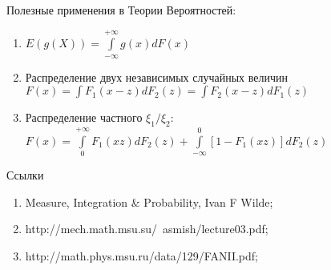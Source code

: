 \documentclass{beamer}%
\theoremstyle{definition}
\begin{document}
\begin{frame}
Полезные применения в Теории Вероятностей:

\begin{enumerate}
    \item $E(g(X)) = \int \limits_{-\infty}^{+\infty} g(x)dF(x)$
    \item Распределение двух независимых случайных величин $F(x) = \int F_1(x - z)dF_2(z) = \int F_2(x - z)dF_1(z)$
    \item Распределение частного $\xi_1/\xi_2$: $F(x) = \int \limits_{0}^{+\infty} F_1(xz)dF_2(z) + \int \limits_{-\infty}^{0} [1 - F_1(xz)]dF_2(z)$
\end{enumerate}
  
\end{frame}
\begin{frame}{Ссылки}

\begin{enumerate}
    \item Measure, Integration \& Probability, Ivan F Wilde;
    \item http://mech.math.msu.su/~asmish/lecture03.pdf;
    \item http://math.phys.msu.ru/data/129/FANII.pdf;
\end{enumerate}

\end{frame}
\end{document}
